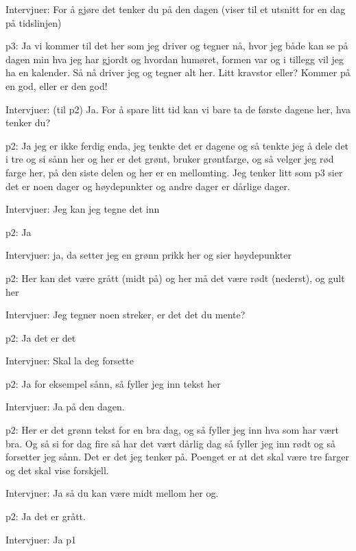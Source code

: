 \documentclass[11pt,UKenglish, a4paper]{article}
\begin{document}
\textcolor{myBlue} {Intervjuer:} For å gjøre det tenker du på den dagen (viser til et utsnitt for en dag på tidslinjen)

\textcolor{myR} {p3:} Ja vi kommer til det her som jeg driver og tegner nå, hvor jeg både kan se på dagen min hva jeg har gjordt og hvordan humøret, formen var og i tillegg vil jeg ha en kalender. Så nå driver jeg og tegner alt her. Litt kravstor eller? Kommer på en god, eller er den god!

\textcolor{myBlue} {Intervjuer:} (til p2) Ja. For å spare litt tid kan vi bare ta de første dagene her, hva tenker du?

\textcolor{myYellow} {p2:} Ja jeg er ikke ferdig enda, jeg tenkte det er dagene og så tenkte jeg å dele det i tre og si sånn her og her er det grønt, bruker grøntfarge, og så velger jeg rød farge her, på den siste delen og her er en mellomting. Jeg tenker litt som p3 sier det er noen dager og høydepunkter og andre dager er dårlige dager.

\textcolor{myBlue} {Intervjuer:} Jeg kan jeg tegne det inn

\textcolor{myYellow} {p2:} Ja

\textcolor{myBlue} {Intervjuer:} ja, da setter jeg en grønn prikk her og sier høydepunkter 

\textcolor{myYellow} {p2:} Her kan det være grått (midt på) og her må det være rødt (nederst), og gult her

\textcolor{myBlue} {Intervjuer:} Jeg tegner noen streker, er det det du mente?

\textcolor{myYellow} {p2:} Ja det er det

\textcolor{myBlue} {Intervjuer:} Skal la deg forsette

\textcolor{myYellow} {p2:} Ja for eksempel sånn, så fyller jeg inn tekst her

\textcolor{myBlue} {Intervjuer:} Ja på den dagen. 

\textcolor{myYellow} {p2:} Her er det grønn tekst for en bra dag, og så fyller jeg inn hva som har vært bra. Og så si for dag fire så har det vært dårlig dag så fyller jeg inn rødt og så forsetter jeg sånn. Det er det jeg tenker på. Poenget er at det skal være tre farger og det skal vise forskjell.

\textcolor{myBlue} {Intervjuer:} Ja så du kan være midt mellom her og.

\textcolor{myYellow} {p2:} Ja det er grått.

\textcolor{myBlue} {Intervjuer:} Ja p1
\end{document}

